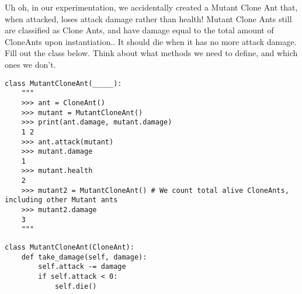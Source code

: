 \question Uh oh, in our experimentation, we accidentally created a Mutant Clone Ant that, when attacked, loses attack damage rather than health! Mutant Clone Ants still are classified as Clone Ants, and have damage equal to the total amount of CloneAnts upon instantiation.. It should die when it has no more attack damage. Fill out the class below. Think about what methods we need to define, and which ones we don't.
\newpage
\begin{lstlisting}
class MutantCloneAnt(_____):
    """
    >>> ant = CloneAnt()
    >>> mutant = MutantCloneAnt()
    >>> print(ant.damage, mutant.damage)
    1 2
    >>> ant.attack(mutant)
    >>> mutant.damage
    1
    >>> mutant.health
    2
    >>> mutant2 = MutantCloneAnt() # We count total alive CloneAnts, including other Mutant ants
    >>> mutant2.damage
    3
    """

\end{lstlisting}

\begin{solution}[1.0in]
\begin{lstlisting}
class MutantCloneAnt(CloneAnt):
    def take_damage(self, damage):
        self.attack -= damage
        if self.attack < 0:
            self.die()
\end{lstlisting}
\end{solution}

